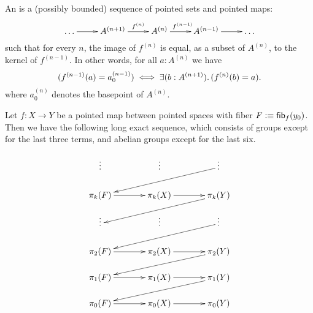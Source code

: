 \documentclass[hott-all.tex]{subfiles}
\begin{document}
% 
% 
\begin{defn}
  An 
  is a (possibly bounded) sequence of pointed sets and pointed maps:
  \[\xymatrix{\dots \ar[r] & A^{(n+1)} \ar[r]^-{f^{(n)}} & A^{(n)} \ar[r]^{f^{(n-1)}} & A^{(n-1)} \ar[r] &
    \dots}\]
  such that for every $n$, the image of $f^{(n)}$ is equal, as a subset of $A^{(n)}$, to the kernel of $f^{(n-1)}$.
  In other words, for all $a:A^{(n)}$ we have
  \[ (f^{(n-1)}(a) = a^{(n-1)}_0) \iff \exis{b:A^{(n+1)}} (f^{(n)}(b)=a). \]
  where $a^{(n)}_0$ denotes the basepoint of $A^{(n)}$.
\end{defn}
% 
% 
\begin{thm}
  Let $f:X \to Y$ be a pointed map between pointed spaces with fiber $F\vcentcolon\equiv {\mathsf{fib}}_{f}(y_0)$.
  Then we have the following long exact sequence, which consists of groups except for the last three terms, and abelian groups except for the last six.

  \[
  \xymatrix@R=1.2pc@C=3pc{
    \vdots & \vdots & \vdots \ar[lld] \\
    \pi_k(F) \ar[r] & \pi_k(X) \ar[r] & \pi_k(Y) \ar[lld] \\
    \vdots & \vdots & \vdots \ar[lld] \\
    \pi_2(F) \ar[r] & \pi_2(X) \ar[r] & \pi_2(Y) \ar[lld] \\
    \pi_1(F) \ar[r] & \pi_1(X) \ar[r] & \pi_1(Y) \ar[lld]\\
    \pi_0(F) \ar[r] & \pi_0(X) \ar[r] & \pi_0(Y)}
  \]
\end{thm}
\end{document}
